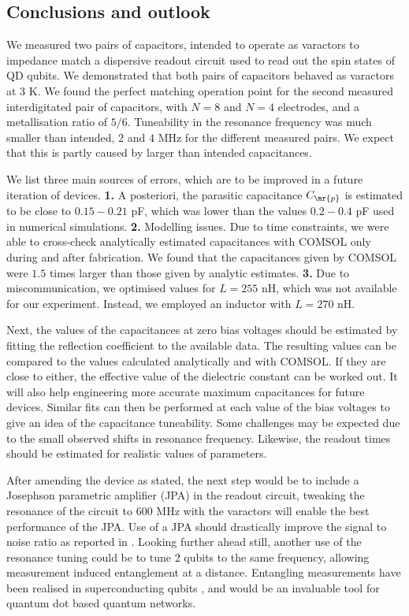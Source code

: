 \documentclass[10pt,a4paper,twoside]{article}
\begin{document}
\begin{multicols}{2}
\section{Conclusions and outlook}
We measured two pairs of capacitors, intended to operate as varactors to impedance match a dispersive readout circuit used to read out the spin states of QD qubits. We demonstrated that both pairs of capacitors behaved as varactors at $3$ K. We found the perfect matching operation point for the second measured interdigitated pair of capacitors, with $N = 8$ and $N = 4$ electrodes, and a metallisation ratio of $5/6$. Tuneability in the resonance frequency was much smaller than intended, $2$ and $4$ MHz for the different measured pairs. We expect that this is partly caused by larger than intended capacitances. 
\par
We list three main sources of errors, which are to be improved in a future iteration of devices. \textbf{1.} A posteriori, the parasitic capacitance $C_{\mr{p}}$ is estimated to be close to $0.15-0.21$ pF, which was lower than the values $0.2-0.4$ pF used in numerical simulations. \textbf{2.} Modelling issues. Due to time constraints, we were able to cross-check analytically estimated capacitances with COMSOL only during and after fabrication. We found that the capacitances given by COMSOL were $1.5$ times larger than those given by analytic estimates. \textbf{3.} Due to miscommunication, we optimised values for $L = 255$ nH, which was not available for our experiment. Instead, we employed an inductor with $L = 270$ nH. 
\par
Next, the values of the capacitances at zero bias voltages should be estimated by fitting the reflection coefficient to the available data. The resulting values can be compared to the values calculated analytically and with COMSOL. If they are close to either, the effective value of the dielectric constant can be worked out. It will also help engineering more accurate maximum capacitances for future devices. Similar fits can then be performed at each value of the bias voltages to give an idea of the capacitance tuneability. Some challenges may be expected due to the small observed shifts in resonance frequency. Likewise, the readout times should be estimated for realistic values of parameters. 
\par
After amending the device as stated, the next step would be to include a Josephson parametric amplifier (JPA) in the readout circuit, tweaking the resonance of the circuit to $600$ MHz with the varactors will enable the best performance of the JPA. Use of a JPA should drastically improve the signal to noise ratio as reported in \cite{jpa}. Looking further ahead still, another use of the resonance tuning could be to tune 2 qubits to the same frequency, allowing measurement induced entanglement at a distance. Entangling measurements have been realised in superconducting qubits \cite{scmeas}, and would be an invaluable tool for quantum dot based quantum networks. 
\end{multicols}
\printbibliography
\end{document}
